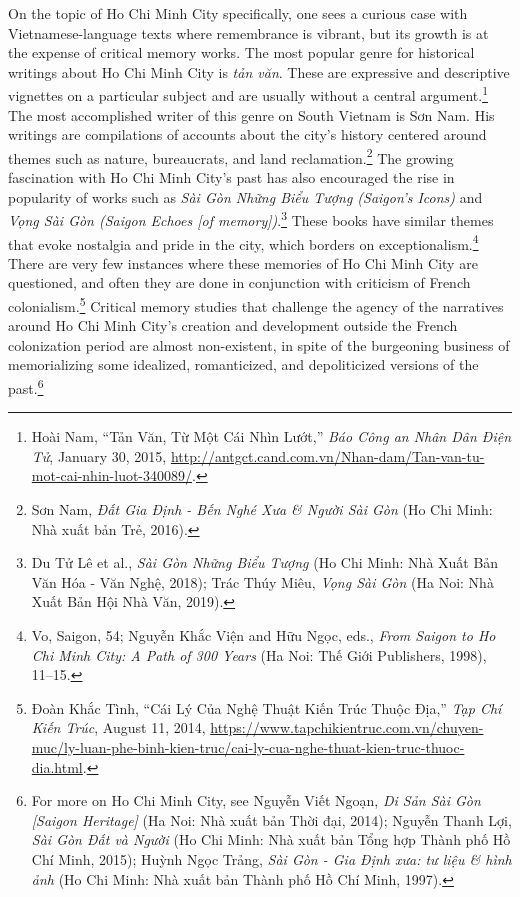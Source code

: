 On the topic of Ho Chi Minh City specifically, one sees a curious case with Vietnamese-language texts where remembrance is vibrant, but its growth is at the expense of critical memory works. The most popular genre for historical writings about Ho Chi Minh City is \textit{tản văn}. These are expressive and descriptive vignettes on a particular subject and are usually without a central argument.\footnote{Hoài Nam, “Tản Văn, Từ Một Cái Nhìn Lướt,” \textit{Báo Công an Nhân Dân Điện Tử}, January 30, 2015, \url{http://antgct.cand.com.vn/Nhan-dam/Tan-van-tu-mot-cai-nhin-luot-340089/}.} The most accomplished writer of this genre on South Vietnam is Sơn Nam. His writings are compilations of accounts about the city’s history centered around themes such as nature, bureaucrats, and land reclamation.\footnote{Sơn Nam, \textit{Đất Gia Định - Bến Nghé Xưa \& Người Sài Gòn} (Ho Chi Minh: Nhà xuất bản Trẻ, 2016).} The growing fascination with Ho Chi Minh City's past has also encouraged the rise in popularity of works such as \textit{Sài Gòn Những Biểu Tượng (Saigon’s Icons)} and \textit{Vọng Sài Gòn (Saigon Echoes [of memory])}.\footnote{Du Tử Lê et al., \textit{Sài Gòn Những Biểu Tượng} (Ho Chi Minh: Nhà Xuất Bản Văn Hóa - Văn Nghệ, 2018); Trác Thúy Miêu, \textit{Vọng Sài Gòn} (Ha Noi: Nhà Xuất Bản Hội Nhà Văn, 2019).} These books have similar themes that evoke nostalgia and pride in the city, which borders on exceptionalism.\footnote{Vo, Saigon, 54; Nguyễn Khắc Viện and Hữu Ngọc, eds., \textit{From Saigon to Ho Chi Minh City: A Path of 300 Years} (Ha Noi: Thế Giới Publishers, 1998), 11–15.} There are very few instances where these memories of Ho Chi Minh City are questioned, and often they are done in conjunction with criticism of French colonialism.\footnote{Đoàn Khắc Tình, “Cái Lý Của Nghệ Thuật Kiến Trúc Thuộc Địa,” \textit{Tạp Chí Kiến Trúc}, August 11, 2014, \url{https://www.tapchikientruc.com.vn/chuyen-muc/ly-luan-phe-binh-kien-truc/cai-ly-cua-nghe-thuat-kien-truc-thuoc-dia.html}.} Critical memory studies that challenge the agency of the narratives around Ho Chi Minh City's creation and development outside the French colonization period are almost non-existent, in spite of the burgeoning business of memorializing some idealized, romanticized, and depoliticized versions of the past.\footnote{For more on Ho Chi Minh City, see Nguyễn Viết Ngoạn, \textit{Di Sản Sài Gòn [Saigon Heritage]} (Ha Noi: Nhà xuất bản Thời đại, 2014); Nguyễn Thanh Lợi, \textit{Sài Gòn Đất và Người} (Ho Chi Minh: Nhà xuất bản Tổng hợp Thành phố Hồ Chí Minh, 2015); Huỳnh Ngọc Trảng, \textit{Sài Gòn - Gia Định xưa: tư liệu \& hình ảnh} (Ho Chi Minh: Nhà xuất bản Thành phố Hồ Chí Minh, 1997).}

